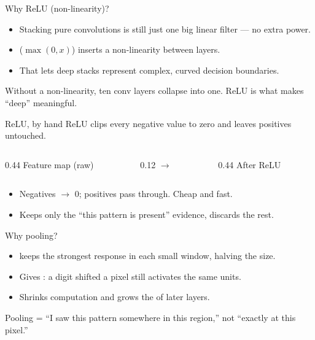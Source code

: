 \documentclass[10pt,aspectratio=169]{beamer}
\begin{document}
\begin{frame}{Why ReLU (non-linearity)?}
  \begin{itemize}
    \item Stacking pure convolutions is still just one big linear filter --- no extra power.
    \item {} ($\max(0,x)$) inserts a non-linearity between layers.
    \item That lets deep stacks represent complex, curved decision boundaries.
  \end{itemize}
  \begin{mathbox}
    Without a non-linearity, ten conv layers collapse into one. ReLU is what makes ``deep'' meaningful.
  \end{mathbox}
\end{frame}

\begin{frame}{ReLU, by hand}
  ReLU clips every negative value to zero and leaves positives untouched.
  \begin{columns}[T]
    \begin{column}{0.44\textwidth}
      \centering \small Feature map (raw)\\[3pt]
    \end{column}
    \begin{column}{0.12\textwidth}
      \centering\vspace{18pt}$\rightarrow$
    \end{column}
    \begin{column}{0.44\textwidth}
      \centering \small After ReLU\\[3pt]
    \end{column}
  \end{columns}
  \vspace{4pt}
  \begin{itemize}
    \item Negatives $\rightarrow$ 0; positives pass through. Cheap and fast.
    \item Keeps only the ``this pattern is present'' evidence, discards the rest.
  \end{itemize}
\end{frame}

\begin{frame}{Why pooling?}
  \begin{itemize}
    \item {} keeps the strongest response in each small window, halving the size.
    \item Gives : a digit shifted a pixel still activates the same units.
    \item Shrinks computation and grows the  of later layers.
  \end{itemize}
  \begin{goodbox}
    Pooling = ``I saw this pattern somewhere in this region,'' not ``exactly at this pixel.''
  \end{goodbox}
\end{frame}
\end{document}
